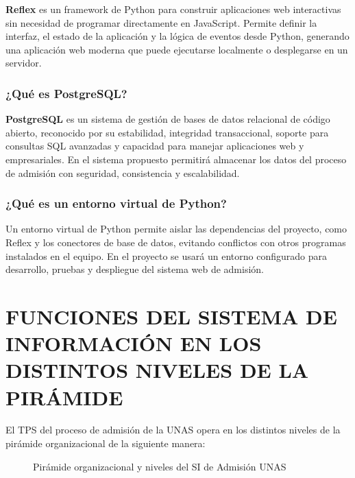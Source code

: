 \documentclass[12pt, a4paper]{report}
\begin{document}
\textbf{Reflex} es un framework de Python para construir aplicaciones web interactivas sin necesidad de programar directamente en JavaScript. Permite definir la interfaz, el estado de la aplicación y la lógica de eventos desde Python, generando una aplicación web moderna que puede ejecutarse localmente o desplegarse en un servidor.

\subsection{¿Qué es PostgreSQL?}

\textbf{PostgreSQL} es un sistema de gestión de bases de datos relacional de código abierto, reconocido por su estabilidad, integridad transaccional, soporte para consultas SQL avanzadas y capacidad para manejar aplicaciones web y empresariales. En el sistema propuesto permitirá almacenar los datos del proceso de admisión con seguridad, consistencia y escalabilidad.

\subsection{¿Qué es un entorno virtual de Python?}

Un entorno virtual de Python permite aislar las dependencias del proyecto, como Reflex y los conectores de base de datos, evitando conflictos con otros programas instalados en el equipo. En el proyecto se usará un entorno configurado para desarrollo, pruebas y despliegue del sistema web de admisión.


\chapter{FUNCIONES DEL SISTEMA DE INFORMACIÓN EN LOS DISTINTOS NIVELES DE LA PIRÁMIDE}

El TPS del proceso de admisión de la UNAS opera en los distintos niveles de la pirámide organizacional de la siguiente manera:

\begin{figure}[H]
  \centering
  \caption{Pirámide organizacional y niveles del SI de Admisión UNAS}
  \label{fig:piramide}
\end{figure}
\end{document}
